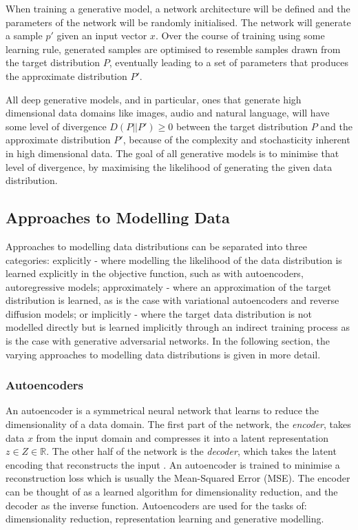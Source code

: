 When training a generative model, a network architecture will be defined and the parameters of the network will be randomly initialised.
The network will generate a sample $p'$ given an input vector $x$. 
Over the course of training using some learning rule, generated samples are optimised to resemble samples drawn from the target distribution $P$, eventually leading to a set of parameters that produces the approximate distribution $P'$.

All deep generative models, and in particular, ones that generate high dimensional data domains like images, audio and natural language, will have some level of divergence $D(P||P') \geq 0$ between the target distribution $P$ and the approximate distribution $P'$, because of the complexity and stochasticity inherent in high dimensional data. 
The goal of all generative models is to minimise that level of divergence, by maximising the likelihood of generating the given data distribution.

\subsection{Approaches to Modelling Data}

Approaches to modelling data distributions can be separated into three categories: explicitly - where modelling the likelihood of the data distribution is learned explicitly in the objective function, such as with autoencoders, autoregressive models; approximately - where an approximation of the target distribution is learned, as is the case with variational autoencoders and reverse diffusion models; or implicitly - where the target data distribution is not modelled directly but is learned implicitly through an indirect training process as is the case with generative adversarial networks.
In the following section, the varying approaches to modelling data distributions is given in more detail. 

\subsubsection{Autoencoders}

An autoencoder is a symmetrical neural network that learns to reduce the dimensionality of a data domain.
The first part of the network, the \textit{encoder}, takes data $x$ from the input domain and compresses it into a latent representation $z \in Z \in \mathbb{R}$. 
The other half of the network is the \textit{decoder}, which takes the latent encoding that reconstructs the input \citep{kramer1991nonlinear}. 
An autoencoder is trained to minimise a reconstruction loss which is usually the Mean-Squared Error (MSE).
The encoder can be thought of as a learned algorithm for dimensionality reduction, and the decoder as the inverse function. 
Autoencoders are used for the tasks of: dimensionality reduction, representation learning and generative modelling.


